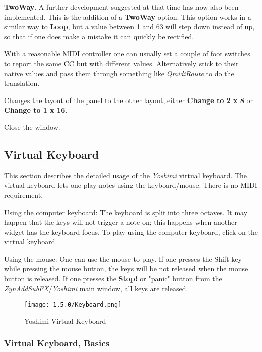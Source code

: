    \textbf{TwoWay}.
   A further development suggested at that time has now also been implemented. This
   is the addition of a \textbf{TwoWay} option.
   This option works in a similar way to \textbf{Loop}, but
   a value between 1 and 63 will step down instead of up, so that if one does make
   a mistake it can quickly be rectified.

   With a reasonable MIDI controller one can usually set a couple of foot switches
   to report the same CC but with different values. Alternatively stick to their
   native values and pass them through something like \textsl{QmidiRoute} to do the
   translation.

   Changes the layout of the panel to the other layout, either
   \textbf{Change to 2 x 8} or
   \textbf{Change to 1 x 16}.

   Close the window.

\subsection{Virtual Keyboard}
\label{subsec:virtual_keyboard}

   This section describes the detailed usage of the
   \textsl{Yoshimi} virtual keyboard.
   The virtual keyboard lets one play notes using the keyboard/mouse. There is
   no MIDI requirement.

   Using the computer keyboard: The keyboard is split into three octaves.
   It may happen that the keys will not trigger a note-on;
   this happens when another widget has the keyboard focus.
   To play using the computer keyboard, click on the virtual keyboard.

   Using the mouse: One can use the mouse to play.  If one presses the
   Shift key while pressing the mouse button, the keys will be not released
   when the mouse button is released.  If one presses the \textbf{Stop!} or
   "panic" button from the \textsl{ZynAddSubFX}/\textsl{Yoshimi} main window,
   all keys are released.

\begin{figure}[H]
   \centering
   \texttt{[image: 1.5.0/Keyboard.png]}
   \caption{Yoshimi Virtual Keyboard}
   \label{fig:yoshimi_virtual_keyboard}
\end{figure}

\subsubsection{Virtual Keyboard, Basics}
\label{subsubsec:virtual_keyboard_basics}

